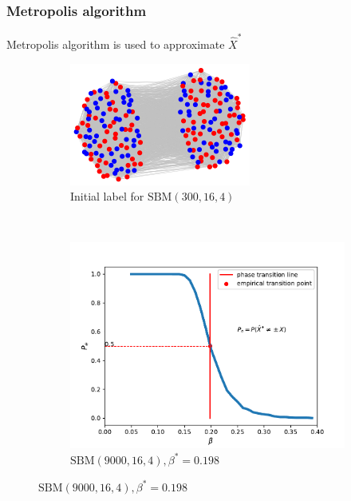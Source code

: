 \documentclass[notheorems]{beamer}
\begin{document}
\begin{frame}
\frametitle{Metropolis algorithm}
Metropolis algorithm is used to approximate $\hat{X}^*$


\begin{figure}
	\centering
	\begin{subfigure}{0.45\textwidth}
		\includegraphics[width=\textwidth]{000.png}
		\caption{Initial label for $\textrm{SBM}(300, 16, 4)$}
	\end{subfigure}~
	\begin{subfigure}{0.53\textwidth}
		\includegraphics[width=\textwidth]{beta_trans-2020-11-28.pdf}
		\caption{$\textrm{SBM}(9000, 16, 4), \beta^*=0.198$}
	\end{subfigure}
\end{figure}
\end{frame}
\end{document}
